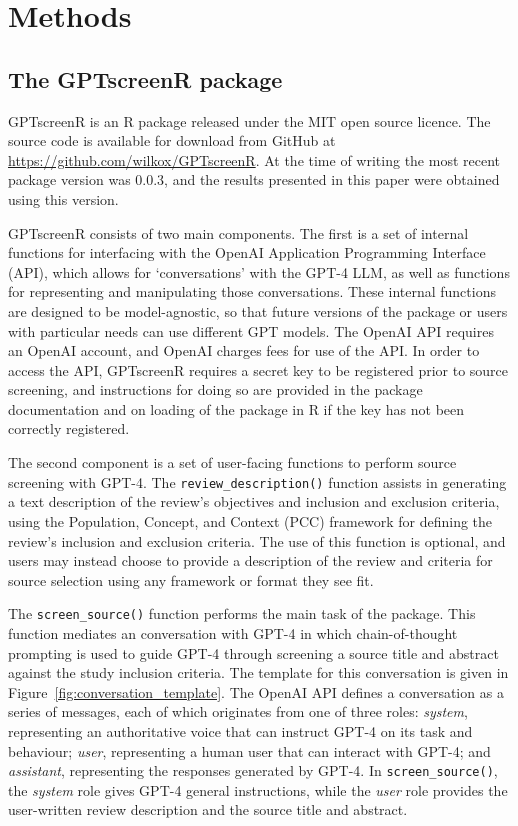 \documentclass[10pt,a4paper,twocolumn]{article}
\begin{document}
\section{Methods}

\subsection{The GPTscreenR package}

GPTscreenR is an R \cite{R.2023} package released under the MIT open source licence. The source code is available for download from GitHub at \url{https://github.com/wilkox/GPTscreenR}. At the time of writing the most recent package version was 0.0.3, and the results presented in this paper were obtained using this version.

GPTscreenR consists of two main components. The first is a set of internal functions for interfacing with the OpenAI Application Programming Interface (API), which allows for `conversations' with the GPT-4 LLM, as well as functions for representing and manipulating those conversations. These internal functions are designed to be model-agnostic, so that future versions of the package or users with particular needs can use different GPT models. The OpenAI API requires an OpenAI account, and OpenAI charges fees for use of the API. In order to access the API, GPTscreenR requires a secret key to be registered prior to source screening, and instructions for doing so are provided in the package documentation and on loading of the package in R if the key has not been correctly registered.

The second component is a set of user-facing functions to perform source screening with GPT-4. The \texttt{review\_description()} function assists in generating a text description of the review's objectives and inclusion and exclusion criteria, using the Population, Concept, and Context (PCC) framework \cite{Peters.2020, JBI.2020} for defining the review's inclusion and exclusion criteria. The use of this function is optional, and users may instead choose to provide a description of the review and criteria for source selection using any framework or format they see fit.

The \texttt{screen\_source()} function performs the main task of the package. This function mediates an conversation with GPT-4 in which chain-of-thought prompting \cite{Wei.2022} is used to guide GPT-4 through screening a source title and abstract against the study inclusion criteria. The template for this conversation is given in Figure~\ref{fig:conversation_template}. The OpenAI API defines a conversation as a series of messages, each of which originates from one of three roles: \textit{system}, representing an authoritative voice that can instruct GPT-4 on its task and behaviour; \textit{user}, representing a human user that can interact with GPT-4; and \textit{assistant}, representing the responses generated by GPT-4. In \texttt{screen\_source()}, the \textit{system} role gives GPT-4 general instructions, while the \textit{user} role provides the user-written review description and the source title and abstract.
\end{document}
